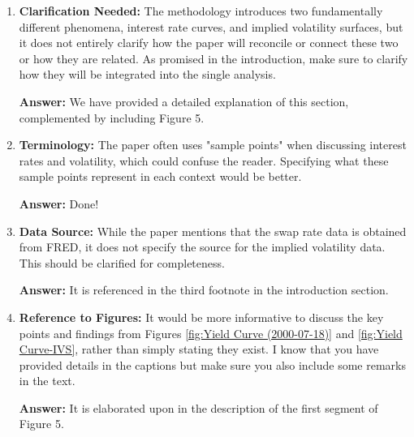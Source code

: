 \begin{enumerate}
\item \textbf{Clarification Needed:} The methodology introduces two fundamentally different phenomena, interest rate curves, and implied volatility surfaces, but it does not entirely clarify how the paper will reconcile or connect these two or how they are related. As promised in the introduction, make sure to clarify how they will be integrated into the single analysis.

\textbf{Answer:}
We have provided a detailed explanation of this section, complemented by including Figure 5.

\item \textbf{Terminology:} The paper often uses "sample points" when discussing interest rates and volatility, which could confuse the reader. Specifying what these sample points represent in each context would be better.

\textbf{Answer:}
Done!

\item \textbf{Data Source:} While the paper mentions that the swap rate data is obtained from FRED, it does not specify the source for the implied volatility data. This should be clarified for completeness.

\textbf{Answer:}
It is referenced in the third footnote in the introduction section.

\item \textbf{Reference to Figures:} It would be more informative to discuss the key points and findings from Figures \ref{fig:Yield Curve (2000-07-18)} and \ref{fig:Yield Curve-IVS}, rather than simply stating they exist. I know that you have provided details in the captions but make sure you also include some remarks in the text. 

\textbf{Answer:}
It is elaborated upon in the description of the first segment of Figure 5.

\end{enumerate}


